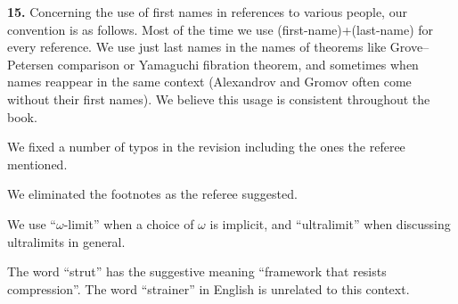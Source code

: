 \documentclass[11pt]{amsart}
\begin{document}
\medskip

{\bf 15.} Concerning the use of first names in references to various people, our convention is as follows.
Most of the time we use (first-name)+(last-name) for every reference.
We use just last names  in the names of theorems like Grove--Petersen comparison or Yamaguchi fibration theorem,  and sometimes when names reappear in the same context (Alexandrov and Gromov often come without their first names).
We believe this usage is consistent throughout the book.

\medskip

We fixed a number of typos in the revision including the ones the referee mentioned.

\medskip

We eliminated the footnotes as the referee suggested.

\medskip

We use ``$\omega$-limit'' when a choice of $\omega$ is implicit, and ``ultralimit'' when  discussing ultralimits in general.

\medskip

The word ``strut'' has the suggestive meaning ``framework that resists compression''.
The word ``strainer'' in English is unrelated to this context.


 
\end{document}
